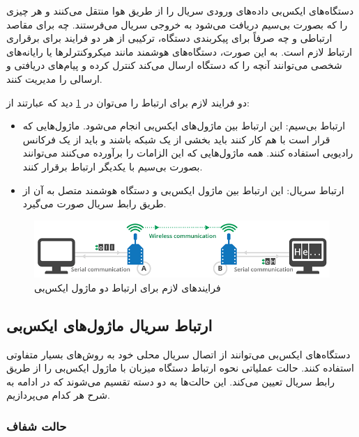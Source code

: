 دستگاه‌های ایکس‌بی داده‌های ورودی سریال را از طریق هوا منتقل می‌کنند و هر چیزی را که بصورت بی‌سیم دریافت می‌شود به خروجی سریال می‌فرستند. چه برای مقاصد ارتباطی و چه صرفاً برای پیکربندی دستگاه، ترکیبی از هر دو فرایند برای برقراری ارتباط لازم است. به این صورت، دستگاه‌های هوشمند مانند میکروکنترلرها یا رایانه‌های شخصی می‌توانند آنچه را که دستگاه ارسال می‌کند کنترل کرده و پیام‌های دریافتی و ارسالی را مدیریت کنند\cite{Digi}.

دو فرایند لازم برای ارتباط را می‌توان در \cref{fig:xbee_communication} \cite{Digi} دید که عبارتند از:
\begin{itemize}
\item ارتباط بی‌سیم: این ارتباط بین ماژول‌های ایکس‌بی انجام می‌شود. ماژول‌هایی که قرار است با هم کار کنند باید بخشی از یک شبکه باشند و باید از یک فرکانس رادیویی استفاده کنند. همه ماژول‌هایی که این الزامات را برآورده می‌کنند می‌توانند بصورت بی‌سیم با یکدیگر ارتباط برقرار کنند.
\item ارتباط سریال: این ارتباط بین ماژول ایکس‌بی و دستگاه هوشمند متصل به آن از طریق رابط سریال صورت می‌گیرد.
\end{itemize}

\begin{figure}[!h]
\centering\includegraphics[scale=.7]{xbee_communication.png}
\caption{فرایندهای لازم برای ارتباط دو ماژول ایکس‌بی \cite{Digi}}\label{fig:xbee_communication}
\end{figure}

\subsection{ارتباط سریال ماژول‌های ایکس‌بی}\label{sub:xbee}

دستگاه‌های ایکس‌بی می‌توانند از اتصال سریال محلی خود به روش‌های بسیار متفاوتی استفاده کنند. حالت عملیاتی نحوه ارتباط دستگاه میزبان با ماژول ایکس‌بی را از طریق رابط سریال تعیین می‌کند. این حالت‌ها به دو دسته تقسیم می‌شوند که در ادامه به شرح هر کدام می‌پردازیم.

\subsubsection{حالت شفاف}

